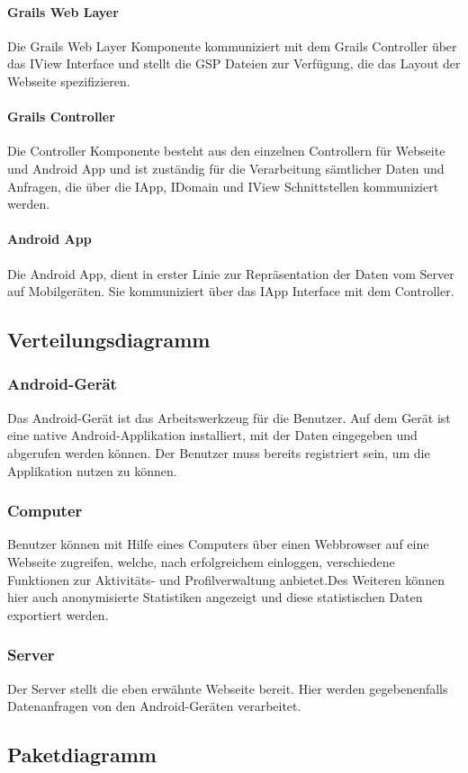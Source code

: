 \paragraph{Grails Web Layer} Die Grails Web Layer Komponente kommuniziert mit dem Grails Controller \"uber das IView Interface und stellt die GSP Dateien zur Verf\"ugung, die das Layout der Webseite spezifizieren.

\paragraph{Grails Controller} Die Controller Komponente besteht aus den einzelnen Controllern f\"ur Webseite und Android App und ist zust\"andig f\"ur die Verarbeitung s\"amtlicher Daten und Anfragen, die \"uber die IApp, IDomain und IView Schnittstellen kommuniziert werden.

\paragraph{Android App} Die Android App, dient in erster Linie zur Repr\"asentation der Daten vom Server auf Mobilger\"aten. Sie kommuniziert \"uber das IApp Interface mit dem Controller.

\subsection{Verteilungsdiagramm}

\subsubsection{Android-Gerät}
Das Android-Gerät ist das Arbeitswerkzeug für die Benutzer. Auf dem Gerät ist eine native Android-Applikation installiert, mit der Daten eingegeben und abgerufen werden können. Der Benutzer muss bereits registriert sein, um die Applikation nutzen zu können.
\subsubsection{Computer}
Benutzer können mit Hilfe eines Computers über einen Webbrowser auf eine Webseite zugreifen, welche, nach erfolgreichem einloggen, verschiedene Funktionen zur Aktivitäts- und Profilverwaltung anbietet.Des Weiteren können hier auch anonymisierte Statistiken angezeigt und diese statistischen Daten exportiert werden.
\subsubsection{Server}
Der Server stellt die eben erwähnte Webseite bereit. Hier werden gegebenenfalls Datenanfragen von den Android-Geräten verarbeitet.
\subsection{Paketdiagramm}